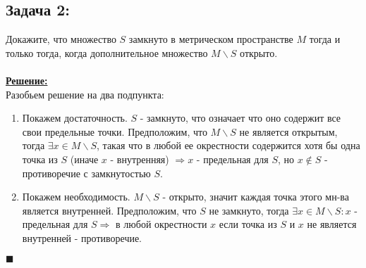 \documentclass[a4paper,12pt,titlepage,final]{article}
\begin{document}
\subsection*{Задача 2:}
\noindent Докажите, что множество $S$ замкнуто в метрическом пространстве $M$ тогда и только тогда, когда дополнительное множество $M\backslash S$ открыто. \\ \\
\textbf{\underline{Решение:}} \\
Разобьем решение на два подпункта:
\begin{enumerate}
    \item Покажем достаточность. $S$ - замкнуто, что означает что оно содержит все свои предельные точки. Предположим, что $M\backslash S$ не является открытым, тогда $\exists x \in M\backslash S$, такая что в любой ее окрестности содержится хотя бы одна точка из $S$ (иначе $x$ - внутренняя) $\Rightarrow x$ - предельная для $S$, но $x \not\in S$ - противоречие с замкнутостью $S$. 
    \item Покажем необходимость. $M\backslash S$ - открыто, значит каждая точка этого мн-ва является внутренней. Предположим, что $S$ не замкнуто, тогда $\exists x \in M\backslash S : x$ - предельная для $S \Rightarrow$ в любой окрестности $x$ если точка из $S$ и $x$ не является внутренней - противоречие.
\end{enumerate}
$\blacksquare$ \\ \\ \\
\end{document}
